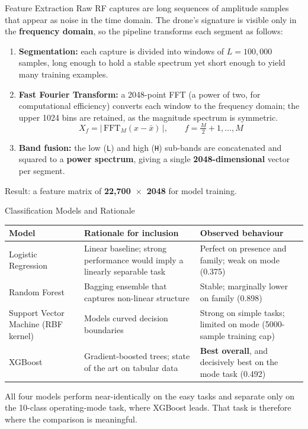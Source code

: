 \documentclass[aspectratio=169,11pt]{beamer}
\begin{document}
\begin{frame}{Feature Extraction}
\footnotesize
Raw RF captures are long sequences of amplitude samples that appear as noise in
the time domain. The drone's signature is visible only in the
\textbf{frequency domain}, so the pipeline transforms each segment as follows:
\begin{enumerate}\footnotesize
\item \textbf{Segmentation:} each capture is divided into windows of
$L = 100{,}000$ samples, long enough to hold a stable spectrum yet short enough
to yield many training examples.
\item \textbf{Fast Fourier Transform:} a 2048-point FFT (a power of two, for
computational efficiency) converts each window to the frequency domain; the
upper 1024 bins are retained, as the magnitude spectrum is symmetric.
\[
X_f = \big|\,\mathrm{FFT}_{M}(x - \bar{x})\,\big|,\qquad f = \tfrac{M}{2}+1,\dots,M
\]
\item \textbf{Band fusion:} the low (\texttt{L}) and high (\texttt{H})
sub-bands are concatenated and squared to a \textbf{power spectrum}, giving a
single \textbf{2048-dimensional} vector per segment.
\end{enumerate}
\vspace{0.1cm}
Result: a feature matrix of \textbf{22{,}700~$\times$~2048} for model training.
\end{frame}

\begin{frame}{Classification Models and Rationale}
\scriptsize
\begin{tabular}{|p{2.9cm}|p{4.2cm}|p{4.4cm}|}
\hline
\textbf{Model} & \textbf{Rationale for inclusion} & \textbf{Observed behaviour} \\
\hline
Logistic Regression & Linear baseline; strong performance would imply a
linearly separable task & Perfect on presence and family; weak on mode (0.375) \\
\hline
Random Forest & Bagging ensemble that captures non-linear structure &
Stable; marginally lower on family (0.898) \\
\hline
Support Vector Machine (RBF kernel) & Models curved decision boundaries &
Strong on simple tasks; limited on mode (5000-sample training cap) \\
\hline
XGBoost & Gradient-boosted trees; state of the art on tabular data &
\textbf{Best overall}, and decisively best on the mode task (0.492) \\
\hline
\end{tabular}
\vspace{0.25cm}

\footnotesize All four models perform near-identically on the easy tasks and
separate only on the 10-class operating-mode task, where XGBoost leads. That
task is therefore where the comparison is meaningful.
\end{frame}
\end{document}
